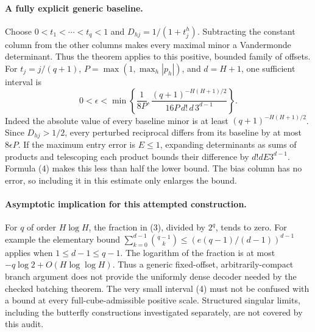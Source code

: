 \documentclass[11pt]{article}
\begin{document}
\paragraph{A fully explicit generic baseline.}
Choose $0<t_1<\cdots<t_q<1$ and
$D_{hj}=1/(1+t_j^h)$. Subtracting the constant column from the other
columns makes every maximal minor a Vandermonde determinant. Thus
the theorem applies to this positive, bounded family of offsets.
For $t_j=j/(q+1)$, $P=\max(1,\max_h|p_h|)$, and
$d=H+1$, one sufficient interval is
\[
 0<\epsilon<\min\left\{\frac1{8P},
 \frac{(q+1)^{-H(H+1)/2}}{16P\,d!\,d\,3^{d-1}}\right\}.
 \tag{4}
\]
Indeed the absolute value of every baseline minor is at least
$(q+1)^{-H(H+1)/2}$. Since $D_{hj}>1/2$, every perturbed reciprocal
differs from its baseline by at most $8\epsilon P$. If the maximum
entry error is $E\leq1$, expanding determinants as sums of products
and telescoping each product bounds their difference by
$d!dE3^{d-1}$. Formula (4) makes this less than half the lower bound.
The bias column has no error, so including it in this estimate only
enlarges the bound.

\paragraph{Asymptotic implication for this attempted construction.}
For $q$ of order $H\log H$, the fraction in (3), divided by $2^q$,
tends to zero. For example the elementary bound
$\sum_{k=0}^{d-1}\binom{q-1}{k}\leq
(e(q-1)/(d-1))^{d-1}$ applies when $1\leq d-1\leq q-1$.
The logarithm of the fraction is at most
$-q\log2+O(H\log\log H)$.
Thus a generic fixed-offset, arbitrarily-compact branch argument does
not provide the uniformly dense decoder needed by the checked batching
theorem. The very small interval (4) must not be confused with a bound
at every full-cube-admissible positive scale. Structured singular
limits, including the butterfly constructions investigated separately,
are not covered by this audit.
\end{document}
